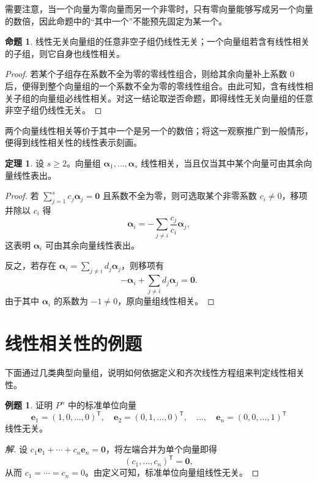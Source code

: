 \documentclass[UTF8, fontset=fandol, a4paper, 12pt]{ctexart}
\newcommand{\va}{\boldsymbol\alpha}
\newcommand{\vo}{\boldsymbol0}
\theoremstyle{definition}
\newtheorem{proposition}[definition]{命题}
\newtheorem{theorem}[definition]{定理}
\newtheorem{example}[definition]{例题}
\begin{document}
需要注意，当一个向量为零向量而另一个非零时，只有零向量能够写成另一个向量的数倍，因此命题中的“其中一个”不能预先固定为某一个。

\begin{proposition}
线性无关向量组的任意非空子组仍线性无关；一个向量组若含有线性相关的子组，则它自身也线性相关。
\end{proposition}
\begin{proof}
若某个子组存在系数不全为零的零线性组合，则给其余向量补上系数 $0$ 后，便得到整个向量组的一个系数不全为零的零线性组合。由此可知，含有线性相关子组的向量组必线性相关。对这一结论取逆否命题，即得线性无关向量组的任意非空子组仍线性无关。
\end{proof}

两个向量线性相关等价于其中一个是另一个的数倍；将这一观察推广到一般情形，便得到线性相关性的线性表示刻画。

\begin{theorem}\label{th:representation}
设 $s\ge2$。向量组 $\va_1,\ldots,\va_s$ 线性相关，当且仅当其中某个向量可由其余向量线性表出。
\end{theorem}
\begin{proof}
若 $\sum_{j=1}^s c_j\va_j=\vo$ 且系数不全为零，则可选取某个非零系数 $c_i\ne0$，移项并除以 $c_i$ 得
\[
 \va_i=-\sum_{j\ne i}\frac{c_j}{c_i}\va_j,
\]
这表明 $\va_i$ 可由其余向量线性表出。

反之，若存在 $\va_i=\sum_{j\ne i}d_j\va_j$，则移项有
\[
 -\va_i+\sum_{j\ne i}d_j\va_j=\vo.
\]
由于其中 $\va_i$ 的系数为 $-1\ne0$，原向量组线性相关。
\end{proof}

\section{线性相关性的例题}

下面通过几类典型向量组，说明如何依据定义和齐次线性方程组来判定线性相关性。

\begin{example}
证明 $P^n$ 中的标准单位向量
\[
 \boldsymbol e_1=(1,0,\ldots,0)^{\mathsf T},\quad
 \boldsymbol e_2=(0,1,\ldots,0)^{\mathsf T},\quad\ldots,\quad
 \boldsymbol e_n=(0,0,\ldots,1)^{\mathsf T}
\]
线性无关。
\end{example}
\begin{proof}[解]
设 $c_1\boldsymbol e_1+\cdots+c_n\boldsymbol e_n=\vo$，将左端合并为单个向量即得
\[
 (c_1,\ldots,c_n)^{\mathsf T}=\vo,
\]
从而 $c_1=\cdots=c_n=0$。由定义可知，标准单位向量组线性无关。
\end{proof}
\end{document}
